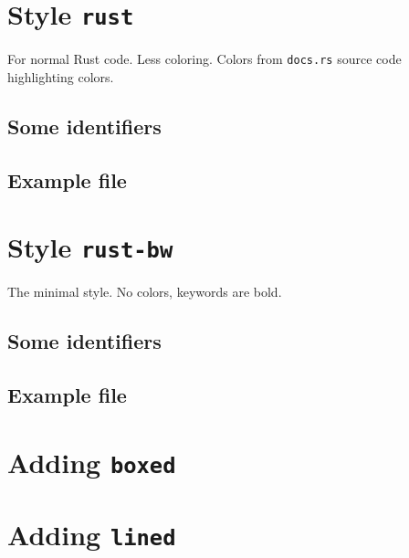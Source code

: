 \documentclass[DIV13]{scrartcl}
\begin{document}
\clearpage
\section*{Style \texttt{rust}}

For normal Rust code. Less coloring. Colors from \texttt{docs.rs} source code
highlighting colors.

\subsection*{Some identifiers}


\clearpage
\subsection*{Example file}



\clearpage
\section*{Style \texttt{rust-bw}}

The minimal style. No colors, keywords are bold.

\subsection*{Some identifiers}


\clearpage
\subsection*{Example file}



\clearpage
\section*{Adding \texttt{boxed}}


\clearpage
\section*{Adding \texttt{lined}}

\end{document}
